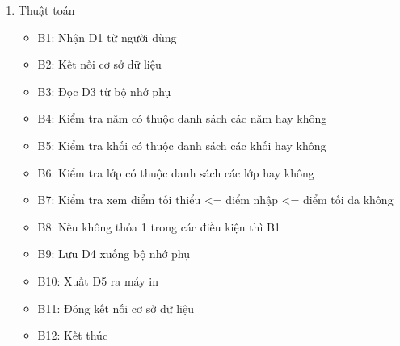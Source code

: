 \documentclass[a4paper]{article}
\begin{document}
\begin{enumerate}[label=\alph*.]
\item Thuật toán
\begin{itemize}
\item B1: Nhận D1 từ người dùng
\item B2: Kết nối cơ sở dữ liệu
\item B3: Đọc D3 từ bộ nhớ phụ
\item B4: Kiểm tra năm có thuộc danh sách các năm hay không
\item B5: Kiểm tra khối có thuộc danh sách các khối hay không
\item B6: Kiểm tra lớp có thuộc danh sách các lớp hay không
\item B7: Kiểm tra xem điểm tối thiểu <= điểm nhập <= điểm tối đa không
\item B8: Nếu không thỏa 1 trong các điều kiện thì B1
\item B9: Lưu D4 xuống bộ nhớ phụ
\item B10: Xuất D5 ra máy in
\item B11: Đóng kết nối cơ sở dữ liệu
\item B12: Kết thúc
\end{itemize}
\end{enumerate}	
	
\end{document}
